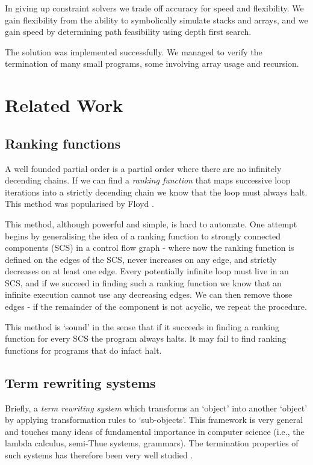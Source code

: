 \documentclass[12pt,a4paper]{article}
\begin{document}
In giving up constraint solvers we trade off accuracy for speed and flexibility.
We gain flexibility from the ability to symbolically simulate stacks and arrays, and we gain speed by determining path feasibility using depth first search.

The solution was implemented successfully. We managed to verify the termination of many small programs, some involving array usage and recursion.

\section{Related Work}
\subsection{Ranking functions}
A well founded partial order is a partial order where there are no infinitely decending chains. If we can find a \emph{ranking function} that maps successive loop iterations into a strictly decending chain we know that the loop must always halt.
This method was popularised by Floyd \citep{floyd}.

This method, although powerful and simple, is hard to automate. One attempt \citep{colon} begins by generalising the idea of a ranking function to strongly connected components (SCS) in a control flow graph - where now the ranking function is defined on the edges of the SCS, never increases on any edge, and strictly decreases on at least one edge. Every potentially infinite loop must live in an SCS, and if we succeed in finding such a ranking function we know that an infinite execution cannot use any decreasing edges. We can then remove those edges - if the remainder of the component is not acyclic, we repeat the procedure.

This method is `sound' in the sense that if it succeeds in finding a ranking function for every SCS the program always halts. It may fail to find ranking functions
for programs that do infact halt.

\subsection{Term rewriting systems}
Briefly, a \emph{term rewriting system} which transforms an `object' into another `object' by applying transformation rules to `sub-objects'. This framework is very general and touches many ideas of fundamental importance in computer science (i.e., the lambda calculus, semi-Thue systems, grammars). The termination properties of such systems has therefore been very well studied \cite[p.~181]{zantema}.
\end{document}
